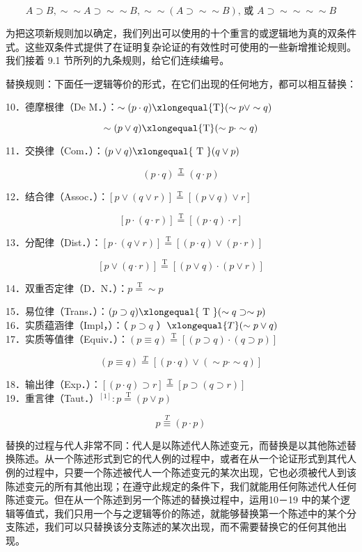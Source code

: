$$
A \supset B, \sim \sim A \supset \sim \sim B, \sim \sim(A \supset \sim \sim B) \text {, 或 } A \supset \sim \sim \sim \sim B
$$

为把这项新规则加以确定，我们列出可以使用的十个重言的或逻辑地为真的双条件式。这些双条件式提供了在证明复杂论证的有效性时可使用的一些新增推论规则。我们接着 9.1 节所列的九条规则，给它们连续编号。

替换规则：下面任一逻辑等价的形式，在它们出现的任何地方，都可以相互替换：

10．德摩根律（De M．）：$\sim(p \cdot q) \xlongequal{\mathrm{T}}(\sim p \vee \sim q)$

$$
\sim(p \vee q) \xlongequal{\mathrm{T}}(\sim p \cdot \sim q)
$$

11．交换律（Com．）：$(p \vee q) \xlongequal{\text { T }}(q \vee p)$

$$
(p \cdot q) \stackrel{\mathrm{T}}{=}(q \cdot p)
$$

12．结合律（Assoc．）：$[p \vee(q \vee r)] \stackrel{\mathrm{T}}{=}[(p \vee q) \vee r]$

$$
[p \cdot(q \cdot r)] \stackrel{\mathrm{T}}{=}[(p \cdot q) \cdot r]
$$

13．分配律（Dist．）：$[p \cdot(q \vee r)] \stackrel{\mathrm{T}}{=}[(p \cdot q) \vee(p \cdot r)]$

$$
[p \vee(q \cdot r)] \stackrel{\mathrm{T}}{=}[(p \vee q) \cdot(p \vee r)]
$$

14．双重否定律（D．N．）：$p \stackrel{\mathrm{~T}}{=} \sim p$

15．易位律（Trans．）：$(p \supset q) \xlongequal{\text { T }}(\sim q \supset \sim p)$\\
16．实质蕴涵律（Impl，）：（ $p \supset q$ ）$\xlongequal{T}(\sim p \vee q)$\\
17．实质等值律（Equiv．）：$(p \equiv q) \stackrel{\mathrm{T}}{=}[(p \supset q) \cdot(q \supset p)]$

$$
(p \equiv q) \stackrel{T}{=}[(p \cdot q) \vee(\sim p \cdot \sim q)]
$$

18．输出律（Exp．）：$[(p \cdot q) \supset r] \stackrel{\mathrm{T}}{=}[p \supset(q \supset r)]$\\
19．重言律（Taut．）${ }^{[1]}: p \stackrel{\mathrm{~T}}{=}(p \vee p)$

$$
p \stackrel{T}{\equiv}(p \cdot p)
$$

替换的过程与代人非常不同：代人是以陈述代人陈述变元，而替换是以其他陈述替换陈述。从一个陈述形式到它的代人例的过程中，或者在从一个论证形式到其代人例的过程中，只要一个陈述被代人一个陈述变元的某次出现，它也必须被代人到该陈述变元的所有其他出现；在遵守此规定的条件下，我们就能用任何陈述代人任何陈述变元。但在从一个陈述到另一个陈述的替换过程中，运用10－19 中的某个逻辑等值式，我们只用一个与之逻辑等价的陈述，就能够替换第一个陈述中的某个分支陈述，我们可以只替换该分支陈述的某次出现，而不需要替换它的任何其他出现。

